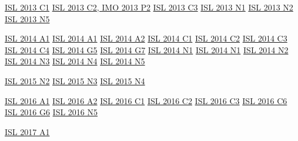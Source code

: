 \hyperref  [problem:ISL 2013 C1]{ISL 2013 C1}
\hyperref  [problem:ISL 2013 C2, IMO 2013 P2]{ISL 2013 C2, IMO 2013 P2}
\hyperref  [problem:ISL 2013 C3]{ISL 2013 C3}
\hyperref  [problem:ISL 2013 N1]{ISL 2013 N1}
\hyperref  [problem:ISL 2013 N2]{ISL 2013 N2}
\hyperref  [problem:ISL 2013 N5]{ISL 2013 N5}

\hyperref  [problem:ISL 2014 A1]{ISL 2014 A1}
\hyperref  [problem:ISL 2014 A1]{ISL 2014 A1}
\hyperref  [problem:ISL 2014 A2]{ISL 2014 A2}
\hyperref  [problem:ISL 2014 C1]{ISL 2014 C1}
\hyperref  [problem:ISL 2014 C2]{ISL 2014 C2}
\hyperref  [problem:ISL 2014 C3]{ISL 2014 C3}
\hyperref  [problem:ISL 2014 C4]{ISL 2014 C4}
\hyperref  [problem:ISL 2014 G5]{ISL 2014 G5}
\hyperref  [problem:ISL 2014 G7]{ISL 2014 G7}
\hyperref  [problem:ISL 2014 N1]{ISL 2014 N1}
\hyperref  [problem:ISL 2014 N1]{ISL 2014 N1}
\hyperref  [problem:ISL 2014 N2]{ISL 2014 N2}
\hyperref  [problem:ISL 2014 N3]{ISL 2014 N3}
\hyperref  [problem:ISL 2014 N4]{ISL 2014 N4}
\hyperref  [problem:ISL 2014 N5]{ISL 2014 N5}

\hyperref  [problem:ISL 2015 N2]{ISL 2015 N2}
\hyperref  [problem:ISL 2015 N3]{ISL 2015 N3}
\hyperref  [problem:ISL 2015 N4]{ISL 2015 N4}

\hyperref  [problem:ISL 2016 A1]{ISL 2016 A1}
\hyperref  [problem:ISL 2016 A2]{ISL 2016 A2}
\hyperref  [problem:ISL 2016 C1]{ISL 2016 C1}
\hyperref  [problem:ISL 2016 C2]{ISL 2016 C2}
\hyperref  [problem:ISL 2016 C3]{ISL 2016 C3}
\hyperref  [problem:ISL 2016 C6]{ISL 2016 C6}
\hyperref  [problem:ISL 2016 G6]{ISL 2016 G6}
\hyperref  [problem:ISL 2016 N5]{ISL 2016 N5}

\hyperref  [problem:ISL 2017 A1]{ISL 2017 A1}